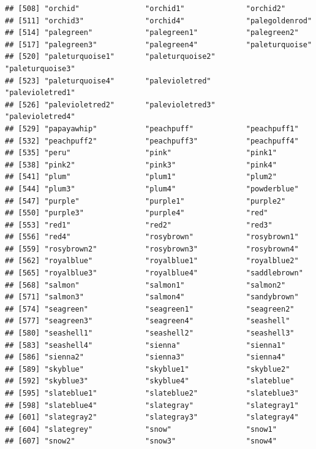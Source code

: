 \documentclass[
]{article}
\begin{document}
\begin{verbatim}
## [508] "orchid"               "orchid1"              "orchid2"             
## [511] "orchid3"              "orchid4"              "palegoldenrod"       
## [514] "palegreen"            "palegreen1"           "palegreen2"          
## [517] "palegreen3"           "palegreen4"           "paleturquoise"       
## [520] "paleturquoise1"       "paleturquoise2"       "paleturquoise3"      
## [523] "paleturquoise4"       "palevioletred"        "palevioletred1"      
## [526] "palevioletred2"       "palevioletred3"       "palevioletred4"      
## [529] "papayawhip"           "peachpuff"            "peachpuff1"          
## [532] "peachpuff2"           "peachpuff3"           "peachpuff4"          
## [535] "peru"                 "pink"                 "pink1"               
## [538] "pink2"                "pink3"                "pink4"               
## [541] "plum"                 "plum1"                "plum2"               
## [544] "plum3"                "plum4"                "powderblue"          
## [547] "purple"               "purple1"              "purple2"             
## [550] "purple3"              "purple4"              "red"                 
## [553] "red1"                 "red2"                 "red3"                
## [556] "red4"                 "rosybrown"            "rosybrown1"          
## [559] "rosybrown2"           "rosybrown3"           "rosybrown4"          
## [562] "royalblue"            "royalblue1"           "royalblue2"          
## [565] "royalblue3"           "royalblue4"           "saddlebrown"         
## [568] "salmon"               "salmon1"              "salmon2"             
## [571] "salmon3"              "salmon4"              "sandybrown"          
## [574] "seagreen"             "seagreen1"            "seagreen2"           
## [577] "seagreen3"            "seagreen4"            "seashell"            
## [580] "seashell1"            "seashell2"            "seashell3"           
## [583] "seashell4"            "sienna"               "sienna1"             
## [586] "sienna2"              "sienna3"              "sienna4"             
## [589] "skyblue"              "skyblue1"             "skyblue2"            
## [592] "skyblue3"             "skyblue4"             "slateblue"           
## [595] "slateblue1"           "slateblue2"           "slateblue3"          
## [598] "slateblue4"           "slategray"            "slategray1"          
## [601] "slategray2"           "slategray3"           "slategray4"          
## [604] "slategrey"            "snow"                 "snow1"               
## [607] "snow2"                "snow3"                "snow4"               

\end{verbatim}
\end{document}
